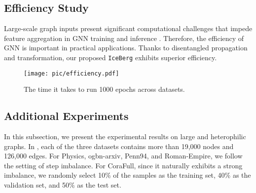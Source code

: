 \subsection{Efficiency Study}
Large-scale graph inputs present significant computational challenges that impede feature aggregation in GNN training and inference \cite{zhang2024two}. Therefore, the efficiency of GNN is important in practical applications. Thanks to disentangled propagation and transformation, our proposed \texttt{IceBerg} exhibits superior efficiency.

\begin{figure}[h]
\centering
\texttt{[image: pic/efficiency.pdf]}
\caption{The time it takes to run 1000 epochs across datasets.}
\label{fig:efficiency}
\end{figure}

\subsection{Additional Experiments}

In this subsection, we present the experimental results on large and heterophilic graphs. In , each of the three datasets contains more than 19,000 nodes and 126,000 edges. For Physics, ogbn-arxiv, Penn94, and Roman-Empire, we follow the setting of step imbalance. For CoraFull, since it naturally exhibits a strong imbalance, we randomly select 10\% of the samples as the training set, 40\% as the validation set, and 50\% as the test set.


